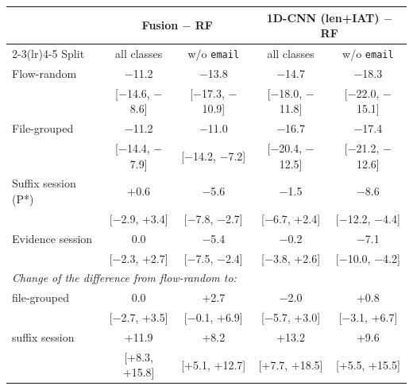 \begin{tabular}{lcccc}
\toprule
 & \multicolumn{2}{c}{Fusion $-$ RF} & \multicolumn{2}{c}{1D-CNN (len+IAT) $-$ RF} \\
\cmidrule(lr){2-3}\cmidrule(lr){4-5}
Split & all classes & w/o \texttt{email} & all classes & w/o \texttt{email} \\
\midrule
Flow-random & $-$11.2 & $-$13.8 & $-$14.7 & $-$18.3 \\
 & [$-$14.6, $-$8.6] & [$-$17.3, $-$10.9] & [$-$18.0, $-$11.8] & [$-$22.0, $-$15.1] \\[1pt]
File-grouped & $-$11.2 & $-$11.0 & $-$16.7 & $-$17.4 \\
 & [$-$14.4, $-$7.9] & [$-$14.2, $-$7.2] & [$-$20.4, $-$12.5] & [$-$21.2, $-$12.6] \\[1pt]
Suffix session (P*) & +0.6 & $-$5.6 & $-$1.5 & $-$8.6 \\
 & [$-$2.9, +3.4] & [$-$7.8, $-$2.7] & [$-$6.7, +2.4] & [$-$12.2, $-$4.4] \\[1pt]
Evidence session & 0.0 & $-$5.4 & $-$0.2 & $-$7.1 \\
 & [$-$2.3, +2.7] & [$-$7.5, $-$2.4] & [$-$3.8, +2.6] & [$-$10.0, $-$4.2] \\[1pt]
\midrule
\multicolumn{5}{l}{\emph{Change of the difference from flow-random to:}} \\
\quad file-grouped & 0.0 & +2.7 & $-$2.0 & +0.8 \\
 & [$-$2.7, +3.5] & [$-$0.1, +6.9] & [$-$5.7, +3.0] & [$-$3.1, +6.7] \\[1pt]
\quad suffix session & +11.9 & +8.2 & +13.2 & +9.6 \\
 & [+8.3, +15.8] & [+5.1, +12.7] & [+7.7, +18.5] & [+5.5, +15.5] \\[1pt]
\bottomrule
\end{tabular}
